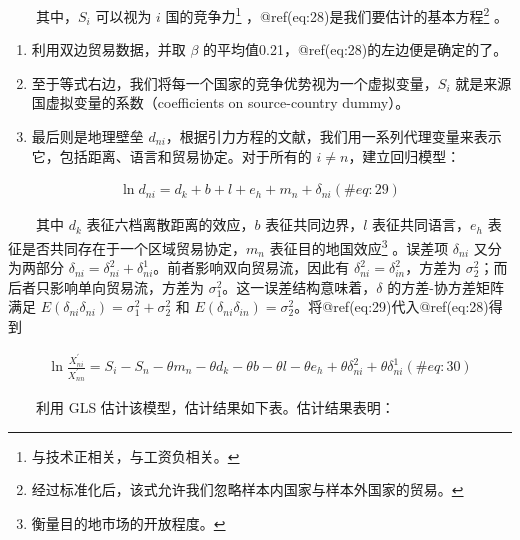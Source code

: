 \documentclass[]{tufte-handout}
\providecommand{\tightlist}{%
  \setlength{\itemsep}{0pt}\setlength{\parskip}{0pt}}
\begin{document}
　　其中，\(S_i\) 可以视为 \(i\) 国的竞争力\footnote{与技术正相关，与工资负相关。}
，@ref(eq:28)是我们要估计的基本方程\footnote{经过标准化后，该式允许我们忽略样本内国家与样本外国家的贸易。}
。

\begin{enumerate}
\def\labelenumi{\arabic{enumi}.}
\tightlist
\item
  利用双边贸易数据，并取 \(\beta\)
  的平均值0.21，@ref(eq:28)的左边便是确定的了。\\
\item
  至于等式右边，我们将每一个国家的竞争优势视为一个虚拟变量，\(S_i\)
  就是来源国虚拟变量的系数（coefficients on source-country dummy）。\\
\item
  最后则是地理壁垒
  \(d_{ni}\)，根据引力方程的文献，我们用一系列代理变量来表示它，包括距离、语言和贸易协定。对于所有的
  \(i \neq n\)，建立回归模型：
\end{enumerate}

\begin{align}
\ln d_{n i}=d_{k}+b+l+e_{h}+m_{n}+\delta_{n i} (\#eq:29)
\end{align}

　　其中 \(d_k\) 表征六档离散距离的效应，\(b\) 表征共同边界，\(l\)
表征共同语言，\(e_h\) 表征是否共同存在于一个区域贸易协定，\(m_n\)
表征目的地国效应\footnote{衡量目的地市场的开放程度。} 。误差项
\(\delta_{n i}\) 又分为两部分
\(\delta_{n i} = \delta_{ni}^2 + \delta_{ni}^1\)。前者影响双向贸易流，因此有
\(\delta_{ni}^2=\delta_{in}^2\)，方差为
\(\sigma_2^2\)；而后者只影响单向贸易流，方差为
\(\sigma_1^2\)。这一误差结构意味着，\(\delta\) 的方差-协方差矩阵满足
\(E(\delta_{ni}\delta_{ni})=\sigma_1^2+\sigma_2^2\) 和
\(E(\delta_{ni}\delta_{in})=\sigma_2^2\)。将@ref(eq:29)代入@ref(eq:28)得到

\begin{align}
\ln \frac{X_{n i}^{\prime}}{X_{n n}^{\prime}}=S_{i}-S_{n}-\theta m_{n}-\theta d_{k}-\theta b-\theta l-\theta e_{h}+\theta \delta_{n i}^{2}+\theta \delta_{n i}^{1} (\#eq:30)
\end{align}

　　利用 GLS 估计该模型，估计结果如下表。估计结果表明：
\end{document}
